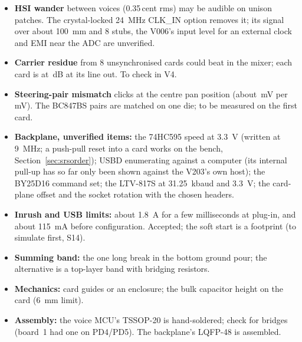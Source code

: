 \documentclass[11pt,a4paper]{article}
\begin{document}
\begin{itemize}
    programmer; USB-MIDI + CDC device runs on the bench on USBFS and enumerated on USBD; a MIDI host on USBFS works in a
    self-loop, a real keyboard is untested); on the card PATCH\_DATA, CALIBRATE, the \SI{5}{V} calibration tables (the firmware and the model
    still use rev 0.1's data) and the dual-PWM ratio measurement.
  \item \textbf{HSI wander} between voices (0.35\,cent rms) may be audible on unison patches. The crystal-locked
    \SI{24}{MHz} CLK\_IN option removes it; its signal over about \SI{100}{mm} and 8 stubs, the V006's input level for an
    external clock and EMI near the ADC are unverified.
  \item \textbf{Carrier residue} from 8 unsynchronised cards could beat in the mixer; each card is at
    \statSelevenCarrier\,dB at its line out. To check in V4.
  \item \textbf{Steering-pair mismatch} clicks at the centre pan position (about \statSthirteenClick\,mV per mV). The
    BC847BS pairs are matched on one die; to be measured on the first card.
  \item \textbf{Backplane, unverified items:} the 74HC595 speed at \SI{3.3}{V} (written at \SI{9}{MHz}; a push-pull
    reset into a card works on the bench, Section~\ref{sec:srsorder}); USBD enumerating against a computer (its internal pull-up
    has so far only been shown against the V203's own host); the BY25D16 command set; the
    LTV-817S at \SI{31.25}{kbaud} and \SI{3.3}{V}; the card-plane offset and the socket rotation with the chosen
    headers.
  \item \textbf{Inrush and USB limits:} about \SI{1.8}{A} for a few milliseconds at plug-in, and about \SI{115}{mA}
    before configuration. Accepted; the soft start is a footprint (to simulate first, S14).
  \item \textbf{Summing band:} the one long break in the bottom ground pour; the alternative is a top-layer band with
    bridging resistors.
  \item \textbf{Mechanics:} card guides or an enclosure; the bulk capacitor height on the card (\SI{6}{mm} limit).
  \item \textbf{Assembly:} the voice MCU's TSSOP-20 is hand-soldered; check for bridges (board~1 had one on
    PD4/PD5). The backplane's LQFP-48 is assembled.
\end{itemize}

\appendix
\end{document}
